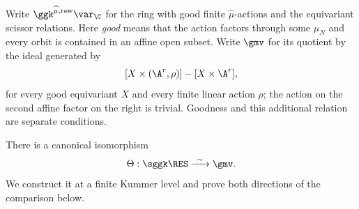 \begin{nota}\label{bipo:gdv}
Write $\ggk^{\widehat\mu,\mathrm{raw}}\var_{\C}$ for the ring with good finite
$\widehat\mu$-actions and the equivariant scissor relations.
Here \emph{good} means that the action factors through some $\mu_N$
and every orbit is contained in an affine open subset.
Write $\gmv$ for its quotient by the ideal generated by
\[
 [X\times(\A^r,\rho)]-[X\times\A^r],
\]
for every good equivariant $X$ and every finite linear action
$\rho$; the action on the second affine factor on the right is
trivial. Goodness and this additional relation are separate
conditions.

There is a canonical isomorphism
\[
 \Theta:\sggk\RES\xrightarrow{\ \sim\ }\gmv .
\]
We construct it at a finite Kummer level and prove both
directions of the comparison below.
\end{nota}

